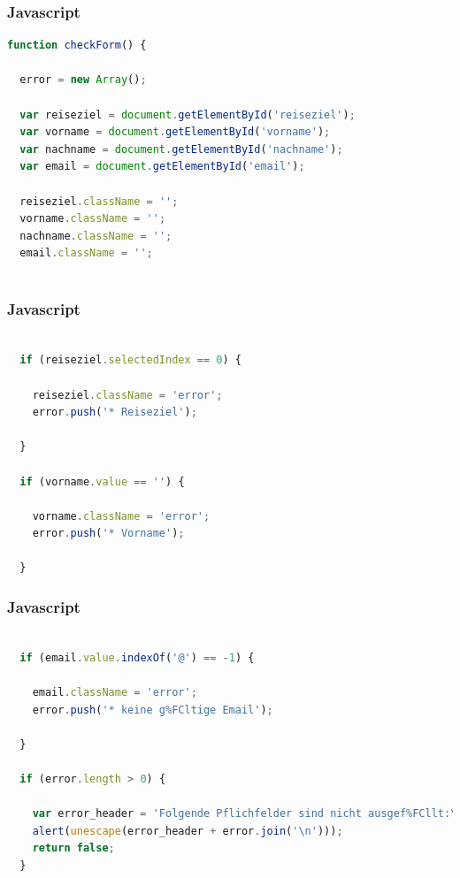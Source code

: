 \documentclass[xcolor=dvipsnames]{beamer}
\begin{document}
\begin{frame}[fragile]
\frametitle{Javascript}

\begin{lstlisting}[language=javascript]
function checkForm() {

  error = new Array();

  var reiseziel = document.getElementById('reiseziel');
  var vorname = document.getElementById('vorname');
  var nachname = document.getElementById('nachname');
  var email = document.getElementById('email');

  reiseziel.className = '';
  vorname.className = '';
  nachname.className = '';
  email.className = '';
	


\end{lstlisting}
\end{frame}

\begin{frame}[fragile]
\frametitle{Javascript}

\begin{lstlisting}[language=javascript, firstnumber=14]
	
  if (reiseziel.selectedIndex == 0) {

    reiseziel.className = 'error';
    error.push('* Reiseziel');

  }

  if (vorname.value == '') {

    vorname.className = 'error';
    error.push('* Vorname');

  }


\end{lstlisting}
\end{frame}

\begin{frame}[fragile]
\frametitle{Javascript}

\begin{lstlisting}[language=javascript, firstnumber=42]

  if (email.value.indexOf('@') == -1) {

    email.className = 'error';
    error.push('* keine g%FCltige Email');

  }

  if (error.length > 0) {

    var error_header = 'Folgende Pflichfelder sind nicht ausgef%FCllt:\n\n';
    alert(unescape(error_header + error.join('\n')));
    return false;
  }
	
\end{lstlisting}
\end{frame}
\end{document}
